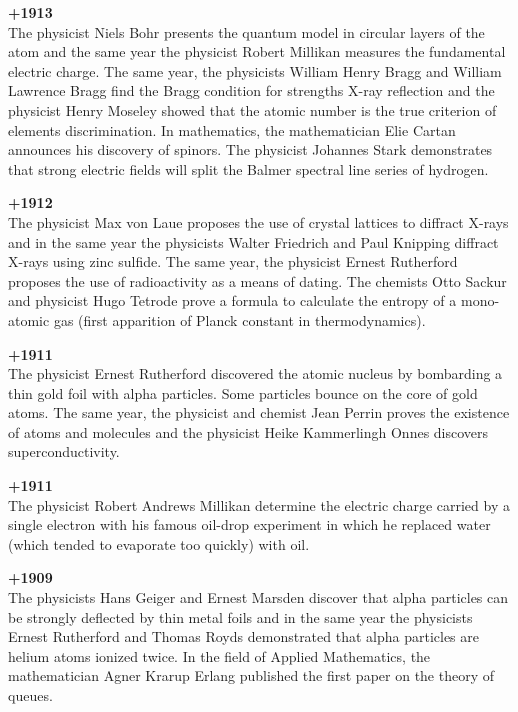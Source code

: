 \textbf{+1913}\\
The physicist Niels Bohr presents the quantum model in circular layers of the atom and the same year the physicist Robert Millikan measures the fundamental electric charge. The same year, the physicists William Henry Bragg and William Lawrence Bragg find the Bragg condition for strengths X-ray reflection and the physicist Henry Moseley showed that the atomic number is the true criterion of elements discrimination. In mathematics, the mathematician Elie Cartan announces his discovery of spinors. The physicist Johannes Stark demonstrates that strong electric fields will split the Balmer spectral line series of hydrogen.

\textbf{+1912}\\
The physicist Max von Laue proposes the use of crystal lattices to diffract X-rays and in the same year the physicists Walter Friedrich and Paul Knipping diffract X-rays using zinc sulfide. The same year, the physicist Ernest Rutherford proposes the use of radioactivity as a means of dating. The chemists Otto Sackur and physicist Hugo Tetrode prove a formula to calculate the entropy of a mono-atomic gas (first apparition of Planck constant in thermodynamics).

\textbf{+1911}\\
The physicist Ernest Rutherford discovered the atomic nucleus by bombarding a thin gold foil with alpha particles. Some particles bounce on the core of gold atoms. The same year, the physicist and chemist Jean Perrin proves the existence of atoms and molecules and the physicist Heike Kammerlingh Onnes discovers superconductivity.

\textbf{+1911}\\
The physicist Robert Andrews Millikan determine the electric charge carried by a single electron with his famous oil-drop experiment in which he replaced water (which tended to evaporate too quickly) with oil.

\textbf{+1909}\\
The physicists Hans Geiger and Ernest Marsden discover that alpha particles can be strongly deflected by thin metal foils and in the same year the physicists Ernest Rutherford and Thomas Royds demonstrated that alpha particles are helium atoms ionized twice. In the field of Applied Mathematics, the mathematician Agner Krarup Erlang published the first paper on the theory of queues. 

